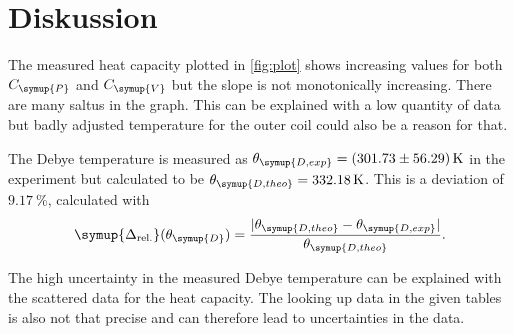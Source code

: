 \section{Diskussion}
\label{sec:Diskussion}
The measured heat capacity plotted in \autoref{fig:plot} shows increasing values for both $C_{\symup{P}}$ and $C_{\symup{V}}$ but the slope is 
not monotonically increasing. There are many saltus in the graph. This can be explained with a low quantity of data but badly adjusted temperature for
the outer coil could also be a reason for that.

The Debye temperature is measured as $\theta_{\symup{D, exp}} = \qty{301.73 +- 56.29}{\kelvin}$ in the experiment but calculated to 
be $\theta_{\symup{D, theo}} = \qty{332.18}{\kelvin}$. This is a deviation of $\qty{9.17}{\percent}$, calculated with
\begin{equation*}
    \symup{\Delta_\text{rel.}}(\theta_{\symup{D}}) = \frac{|\theta_{\symup{D, theo}} - \theta_{\symup{D, exp}}|}{\theta_{\symup{D, theo}}}.
\end{equation*}

The high uncertainty in the measured Debye temperature can be explained with the scattered data for the heat capacity. The looking up data in the given tables
is also not that precise and can therefore lead to uncertainties in the data.